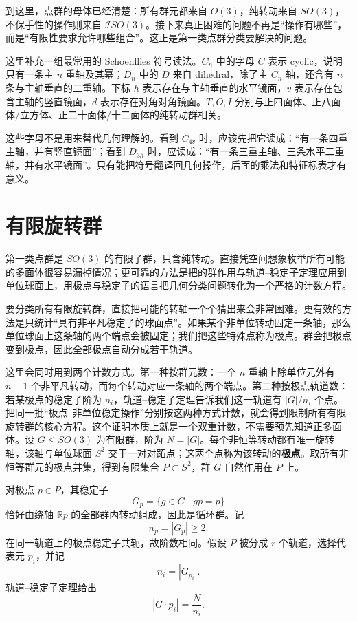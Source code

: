 到这里，点群的母体已经清楚：所有群元都来自 $O(3)$，纯转动来自 $SO(3)$，不保手性的操作则来自 $\mathcal I SO(3)$。接下来真正困难的问题不再是“操作有哪些”，而是“有限性要求允许哪些组合”。这正是第一类点群分类要解决的问题。

这里补充一组最常用的 Schoenflies 符号读法。$C_n$ 中的字母 $C$ 表示 cyclic，说明只有一条主 $n$ 重轴及其幂；$D_n$ 中的 $D$ 来自 dihedral，除了主 $C_n$ 轴，还含有 $n$ 条与主轴垂直的二重轴。下标 $h$ 表示存在与主轴垂直的水平镜面，$v$ 表示存在包含主轴的竖直镜面，$d$ 表示存在对角对角镜面。$T,O,I$ 分别与正四面体、正八面体/立方体、正二十面体/十二面体的纯转动群相关。

这些字母不是用来替代几何理解的。看到 $C_{4v}$ 时，应该先把它读成：“有一条四重主轴，并有竖直镜面”；看到 $D_{3h}$ 时，应读成：“有一条三重主轴、三条水平二重轴，并有水平镜面”。只有能把符号翻译回几何操作，后面的乘法和特征标表才有意义。

\section{有限旋转群}
\label{sec:proper-point-groups}

第一类点群是 $SO(3)$ 的有限子群，只含纯转动。直接凭空间想象枚举所有可能的多面体很容易漏掉情况；更可靠的方法是把的群作用与轨道--稳定子定理应用到单位球面上，用极点与稳定子的语言把几何分类问题转化为一个严格的计数方程。

要分类所有有限旋转群，直接把可能的转轴一个个猜出来会非常困难。更有效的方法是只统计“具有非平凡稳定子的球面点”。如果某个非单位转动固定一条轴，那么单位球面上这条轴的两个端点会被固定；我们把这些特殊点称为极点。群会把极点变到极点，因此全部极点自动分成若干轨道。

这里会同时用到两个计数方式。第一种按群元数：一个 $n$ 重轴上除单位元外有 $n-1$ 个非平凡转动，而每个转动对应一条轴的两个端点。第二种按极点轨道数：若某极点的稳定子阶为 $n_i$，轨道--稳定子定理告诉我们这一轨道有 $|G|/n_i$ 个点。把同一批“极点--非单位稳定操作”分别按这两种方式计数，就会得到限制所有有限旋转群的核心方程。这个证明本质上就是一个双重计数，不需要预先知道正多面体。设 $G\leqslant SO(3)$ 为有限群，阶为 $N=|G|$。每个非恒等转动都有唯一旋转轴，该轴与单位球面 $S^2$ 交于一对对跖点；这两个点称为该转动的\textbf{极点}。取所有非恒等群元的极点并集，得到有限集合 $P\subset S^2$，群 $G$ 自然作用在 $P$ 上。

对极点 $p\in P$，其稳定子
\[
G_p=\{g\in G\mid gp=p\}
\]
恰好由绕轴 $\mathbb Rp$ 的全部群内转动组成，因此是循环群。记
\[
n_p=|G_p|\ge2.
\]
在同一轨道上的极点稳定子共轭，故阶数相同。假设 $P$ 被分成 $r$ 个轨道，选择代表元 $p_i$，并记
\[
n_i=|G_{p_i}|.
\]
轨道--稳定子定理给出
\[
|G\cdot p_i|=\frac{N}{n_i}.
\]

